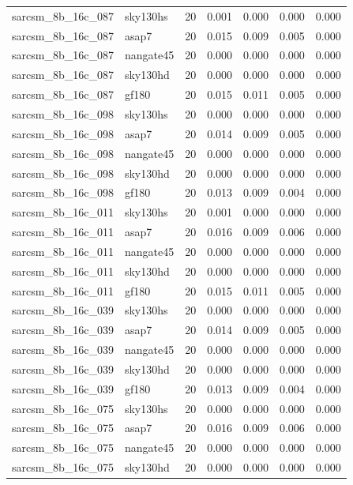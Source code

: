 \begin{tabular}{llrrrrr}
sarcsm\_8b\_16c\_087 & sky130hs & 20 & 0.001 & 0.000 & 0.000 & 0.000 \\
sarcsm\_8b\_16c\_087 & asap7 & 20 & 0.015 & 0.009 & 0.005 & 0.000 \\
sarcsm\_8b\_16c\_087 & nangate45 & 20 & 0.000 & 0.000 & 0.000 & 0.000 \\
sarcsm\_8b\_16c\_087 & sky130hd & 20 & 0.000 & 0.000 & 0.000 & 0.000 \\
sarcsm\_8b\_16c\_087 & gf180 & 20 & 0.015 & 0.011 & 0.005 & 0.000 \\
sarcsm\_8b\_16c\_098 & sky130hs & 20 & 0.000 & 0.000 & 0.000 & 0.000 \\
sarcsm\_8b\_16c\_098 & asap7 & 20 & 0.014 & 0.009 & 0.005 & 0.000 \\
sarcsm\_8b\_16c\_098 & nangate45 & 20 & 0.000 & 0.000 & 0.000 & 0.000 \\
sarcsm\_8b\_16c\_098 & sky130hd & 20 & 0.000 & 0.000 & 0.000 & 0.000 \\
sarcsm\_8b\_16c\_098 & gf180 & 20 & 0.013 & 0.009 & 0.004 & 0.000 \\
sarcsm\_8b\_16c\_011 & sky130hs & 20 & 0.001 & 0.000 & 0.000 & 0.000 \\
sarcsm\_8b\_16c\_011 & asap7 & 20 & 0.016 & 0.009 & 0.006 & 0.000 \\
sarcsm\_8b\_16c\_011 & nangate45 & 20 & 0.000 & 0.000 & 0.000 & 0.000 \\
sarcsm\_8b\_16c\_011 & sky130hd & 20 & 0.000 & 0.000 & 0.000 & 0.000 \\
sarcsm\_8b\_16c\_011 & gf180 & 20 & 0.015 & 0.011 & 0.005 & 0.000 \\
sarcsm\_8b\_16c\_039 & sky130hs & 20 & 0.000 & 0.000 & 0.000 & 0.000 \\
sarcsm\_8b\_16c\_039 & asap7 & 20 & 0.014 & 0.009 & 0.005 & 0.000 \\
sarcsm\_8b\_16c\_039 & nangate45 & 20 & 0.000 & 0.000 & 0.000 & 0.000 \\
sarcsm\_8b\_16c\_039 & sky130hd & 20 & 0.000 & 0.000 & 0.000 & 0.000 \\
sarcsm\_8b\_16c\_039 & gf180 & 20 & 0.013 & 0.009 & 0.004 & 0.000 \\
sarcsm\_8b\_16c\_075 & sky130hs & 20 & 0.000 & 0.000 & 0.000 & 0.000 \\
sarcsm\_8b\_16c\_075 & asap7 & 20 & 0.016 & 0.009 & 0.006 & 0.000 \\
sarcsm\_8b\_16c\_075 & nangate45 & 20 & 0.000 & 0.000 & 0.000 & 0.000 \\
sarcsm\_8b\_16c\_075 & sky130hd & 20 & 0.000 & 0.000 & 0.000 & 0.000 \\

\end{tabular}
